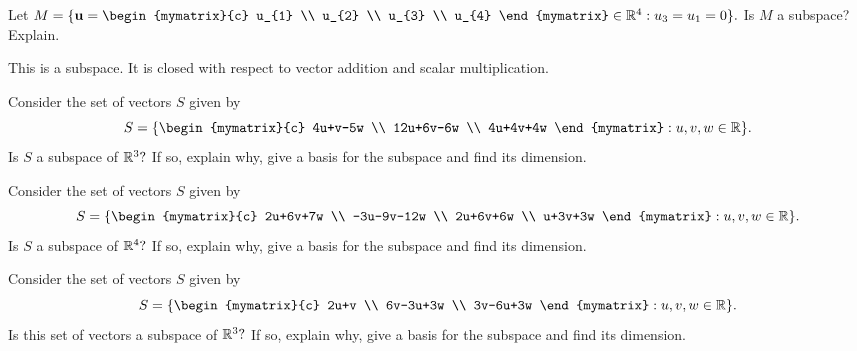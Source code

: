 \begin{enumialphparenastyle}
\begin{ex} Let $M=\set{\vect{u}=\begin{mymatrix}{c}
u_{1} \\
u_{2} \\
u_{3} \\
u_{4}
\end{mymatrix} \in 
\R^{4}:u_{3}=u_{1}=0} .$ Is $M$ a subspace? Explain.
\begin{sol}
This is a subspace. It is closed with respect to vector addition and scalar
multiplication.
\end{sol}
\end{ex}

\begin{ex} Consider the set of vectors $S$ given by  
\begin{equation*}
S = 
\set{\begin{mymatrix}{c}
4u+v-5w \\ 
12u+6v-6w \\ 
4u+4v+4w
\end{mymatrix} :u,v,w\in \R} .
\end{equation*}
Is $S$ a subspace of $\mathbb{R}^{3}?$ If so, explain why,
give a basis for the subspace and find its dimension.
\end{ex}

\begin{ex} Consider the set of vectors $S$ given by 
\begin{equation*}
S = 
\set{\begin{mymatrix}{c}
2u+6v+7w \\ 
-3u-9v-12w \\ 
2u+6v+6w \\ 
u+3v+3w
\end{mymatrix} :u,v,w\in \R} .
\end{equation*}
Is $S$ a subspace of $\mathbb{R}^{4}?$ If so, explain why,
give a basis for the subspace and find its dimension.
\end{ex}

\begin{ex} Consider the set of vectors $S$ given by 
\begin{equation*}
S = 
\set{\begin{mymatrix}{c}
2u+v \\ 
6v-3u+3w \\ 
3v-6u+3w
\end{mymatrix} :u,v,w\in \R} .
\end{equation*}
Is this set of vectors a subspace of $\mathbb{R}^{3}?$ If so, explain why,
give a basis for the subspace and find its dimension.
\end{ex}


\end{enumialphparenastyle}
